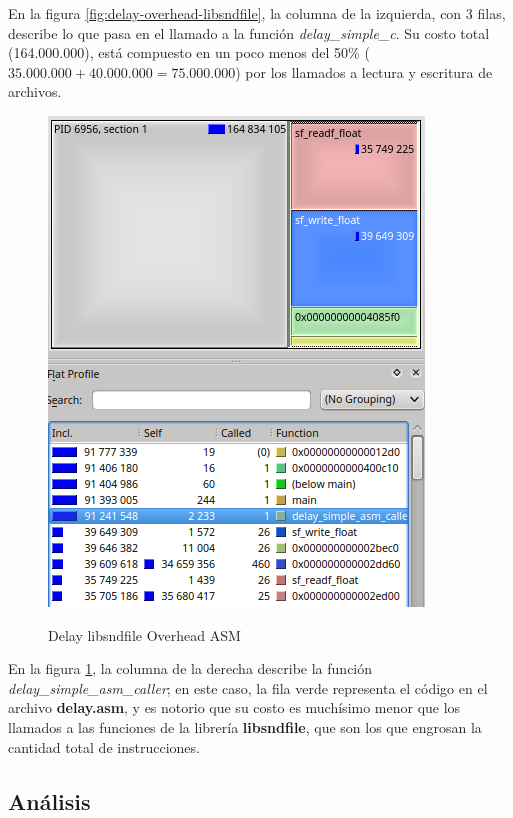 En la figura \ref{fig:delay-overhead-libsndfile}, la columna de la izquierda, con 3 filas, describe lo que pasa en el llamado a la función \textit{delay\_simple\_c}. Su costo total (164.000.000), está compuesto en un poco menos del 50\% ($35.000.000+40.000.000 = 75.000.000$) por los llamados a lectura y escritura de archivos.

\begin{figure}[H]
    \centering
    \includegraphics[scale=0.7]{imagenes/delay-overhead-libsndfile-asm.png}
    \label{fig:delay-overhead-libsndfile-asm}
    \caption{Delay libsndfile Overhead ASM}
\end{figure}

En la figura \ref{fig:delay-overhead-libsndfile-asm}, la columna de la derecha describe la función \textit{delay\_simple\_asm\_caller}; en este caso, la fila verde representa el código en el archivo \textbf{delay.asm}, y es notorio que su costo es muchísimo menor que los llamados a las funciones de la librería \textbf{libsndfile}, que son los que engrosan la cantidad total de instrucciones. 

\subsection{Análisis}